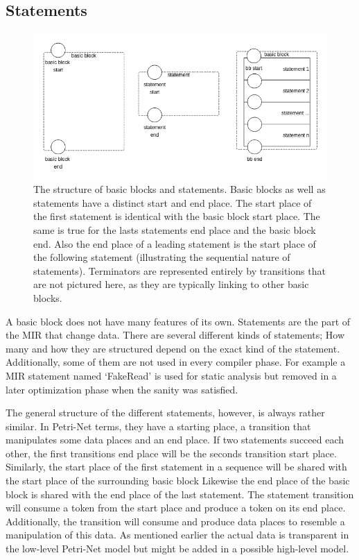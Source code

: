 \subsection{Statements}
\begin{figure}
    \centering
    \includegraphics[width=.9\textwidth]{../diagrams/basic_blocks.png}
    \caption{
        The structure of basic blocks and statements.
        Basic blocks as well as statements have a distinct start and end place.
        The start place of the first statement is identical with the basic block start place.
        The same is true for the lasts statements end place and the basic block end.
        Also the end place of a leading statement is the start place of the following statement (illustrating the sequential nature of statements).
        Terminators are represented entirely by transitions that are not pictured here, as they are typically linking to other basic blocks.
    }
    \label{basic_block_trans}
\end{figure}A basic block does not have many features of its own.
Statements are the part of the MIR that change data.
There are several different kinds of statements;
How many and how they are structured depend on the exact kind of the statement.
Additionally, some of them are not used in every compiler phase.
For example a MIR statement named `FakeRead' is used for static analysis but removed in a later optimization phase when the sanity was satisfied.

The general structure of the different statements, however, is always rather similar.
In Petri-Net terms, they have a starting place, a transition that manipulates some data places and an end place.
If two statements succeed each other, the first transitions end place will be the seconds transition start place.
Similarly, the start place of the first statement in a sequence will be shared with the start place of the surrounding basic block
Likewise the end place of the basic block is shared with the end place of the last statement.
The statement transition will consume a token from the start place and produce a token on its end place.
Additionally, the transition will consume and produce data places to resemble a manipulation of this data.
As mentioned earlier the actual data is transparent in the low-level Petri-Net model but might be added in a possible high-level model.

